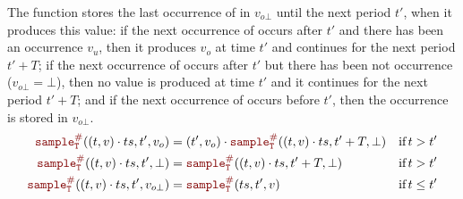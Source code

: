 The function  stores the last occurrence of \ts in $v_{o\bot}$ until
the next period $t'$, when it produces this value:
if the next occurrence of \ts occurs after $t'$ and there has been an occurrence $v_u$, then it
produces $v_o$ at time $t'$ and continues for the next period $t' + T$;
if the next occurrence of \ts occurs after $t'$ but there has been not occurrence ($v_{o\bot} =
    \bot$), then no value is produced at time $t'$ and it continues for the next period $t' + T$;
and
if the next occurrence of \ts occurs before $t'$, then the occurrence is stored in $v_{o\bot}$.
\begin{align}
    \sampleAux{(t, v) \next \ts}{T}{t'}{v_o}       & = (t', v_o) \next \sampleAux{(t, v) \next \ts}{T}{t'+T}{\bot} & \text{if} & \, t > t' \label{eq:semantics:grfrp:denot:op:sample:aux:1}   \\
    \sampleAux{(t, v) \next \ts}{T}{t'}{\bot}      & = \sampleAux{(t, v) \next \ts}{T}{t'+T}{\bot}                 & \text{if} & \,  t > t' \label{eq:semantics:grfrp:denot:op:sample:aux:2}  \\
    \sampleAux{(t, v) \next \ts}{T}{t'}{v_{o\bot}} & = \sampleAux{\ts}{T}{t'}{v}                                   & \text{if} & \, t \le t' \label{eq:semantics:grfrp:denot:op:sample:aux:3}
\end{align}

